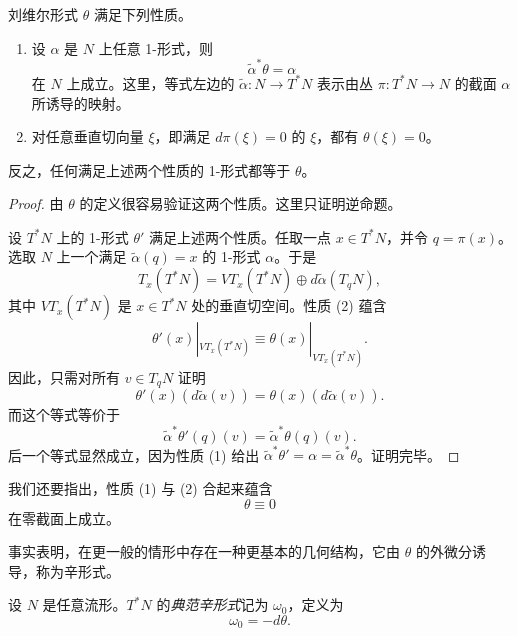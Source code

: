 \begin{proposition}
\label{prop:liouville-characterization}
刘维尔形式 $\theta$ 满足下列性质。
\begin{enumerate}[label=(\arabic*)]
  \item 设 $\alpha$ 是 $N$ 上任意 1-形式，则
  \begin{equation}
    \widetilde\alpha^*\theta=\alpha
    \label{eq:2.1.2}
  \end{equation}
  在 $N$ 上成立。这里，等式左边的 $\widetilde\alpha:N\to T^*N$ 表示由丛 $\pi:T^*N\to N$ 的截面 $\alpha$ 所诱导的映射。
  \item 对任意垂直切向量 $\xi$，即满足 $d\pi(\xi)=0$ 的 $\xi$，都有 $\theta(\xi)=0$。
\end{enumerate}
反之，任何满足上述两个性质的 1-形式都等于 $\theta$。
\end{proposition}

\begin{proof}
由 $\theta$ 的定义很容易验证这两个性质。这里只证明逆命题。

设 $T^*N$ 上的 1-形式 $\theta'$ 满足上述两个性质。任取一点 $x\in T^*N$，并令 $q=\pi(x)$。选取 $N$ 上一个满足 $\widetilde\alpha(q)=x$ 的 1-形式 $\alpha$。于是
\[
  T_x(T^*N)=VT_x(T^*N)\oplus d\widetilde\alpha(T_qN),
\]
其中 $VT_x(T^*N)$ 是 $x\in T^*N$ 处的垂直切空间。性质 (2) 蕴含
\[
  \theta'(x)|_{VT_x(T^*N)}\equiv
  \theta(x)|_{VT_x(T^*N)}.
\]
因此，只需对所有 $v\in T_qN$ 证明
\[
  \theta'(x)(d\widetilde\alpha(v))
  =\theta(x)(d\widetilde\alpha(v)).
\]
而这个等式等价于
\[
  \widetilde\alpha^*\theta'(q)(v)
  =\widetilde\alpha^*\theta(q)(v).
\]
后一个等式显然成立，因为性质 (1) 给出
$\widetilde\alpha^*\theta'=\alpha=\widetilde\alpha^*\theta$。证明完毕。
\end{proof}

我们还要指出，性质 (1) 与 (2) 合起来蕴含
\begin{equation}
  \theta\equiv 0
  \label{eq:2.1.3}
\end{equation}
在零截面上成立。

事实表明，在更一般的情形中存在一种更基本的几何结构，它由 $\theta$ 的外微分诱导，称为辛形式。

\begin{definition}[典范辛形式]
\label{def:canonical-symplectic-form}
设 $N$ 是任意流形。$T^*N$ 的\emph{典范辛形式}记为 $\omega_0$，定义为
\[
  \omega_0=-d\theta.
\]
\end{definition}

